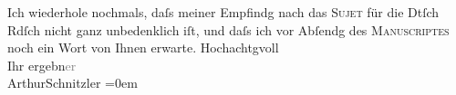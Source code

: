 \begin{ledgroupsized}[t]{13cm}
           \pstart
           Ich wiederhole nochmals, daſs meiner Empfindg nach das \textsc{Sujet} für die Dtſch Rdſch nicht ganz
               unbedenklich iſt, und daſs ich vor Abſendg des \textsc{Manuscriptes} noch ein Wort von Ihnen erwarte.\pend
           \pstart
           Hochachtgvoll{\\[\baselineskip]} Ihr ergebn\textcolor{gray}{er}{\\[\baselineskip]}\spacefill\mbox{ArthurSchnitzler}\pend
           \leftskip=0em{}
         
         \endnumbering{}\end{ledgroupsized}  \newcommand{\dateiname}{L01048}\newcommand{\titel}{Arthur Schnitzler an Julius Rodenberg, 21. 6. 1900}\newcommand{\editorInnen}{Martin Anton Müller und Gerd-Hermann Susen}
      